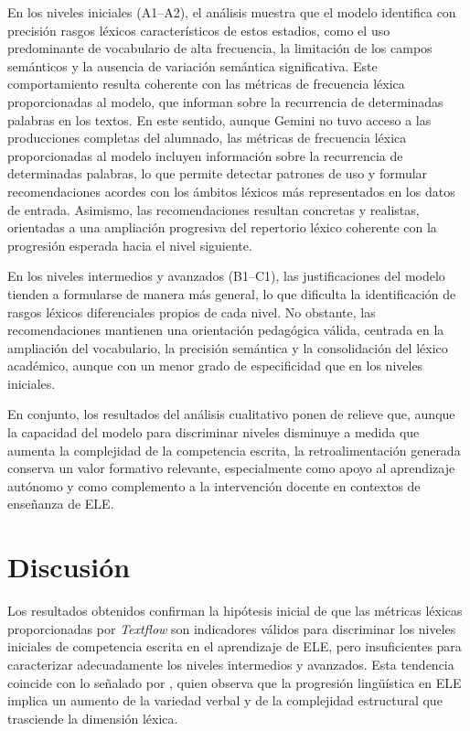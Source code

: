 \documentclass[spanish]{textolivre}
\begin{document}
En los niveles iniciales (A1–A2), el análisis muestra que el modelo identifica con precisión rasgos léxicos característicos de estos estadios, como el uso predominante de vocabulario de alta frecuencia, la limitación de los campos semánticos y la ausencia de variación semántica significativa. Este comportamiento resulta coherente con las métricas de frecuencia léxica proporcionadas al modelo, que informan sobre la recurrencia de determinadas palabras en los textos. En este sentido, aunque Gemini no tuvo acceso a las producciones completas del alumnado, las métricas de frecuencia léxica proporcionadas al modelo incluyen información sobre la recurrencia de determinadas palabras, lo que permite detectar patrones de uso y formular recomendaciones acordes con los ámbitos léxicos más representados en los datos de entrada. Asimismo, las recomendaciones resultan concretas y realistas, orientadas a una ampliación progresiva del repertorio léxico coherente con la progresión esperada hacia el nivel siguiente.

En los niveles intermedios y avanzados (B1–C1), las justificaciones del modelo tienden a formularse de manera más general, lo que dificulta la identificación de rasgos léxicos diferenciales propios de cada nivel. No obstante, las recomendaciones mantienen una orientación pedagógica válida, centrada en la ampliación del vocabulario, la precisión semántica y la consolidación del léxico académico, aunque con un menor grado de especificidad que en los niveles iniciales.

En conjunto, los resultados del análisis cualitativo ponen de relieve que, aunque la capacidad del modelo para discriminar niveles disminuye a medida que aumenta la complejidad de la competencia escrita, la retroalimentación generada conserva un valor formativo relevante, especialmente como apoyo al aprendizaje autónomo y como complemento a la intervención docente en contextos de enseñanza de ELE.


\section{Discusión}

Los resultados obtenidos confirman la hipótesis inicial de que las métricas léxicas proporcionadas por \textit{Textflow} son indicadores válidos para discriminar los niveles iniciales de competencia escrita en el aprendizaje de ELE, pero insuficientes para caracterizar adecuadamente los niveles intermedios y avanzados. Esta tendencia coincide con lo señalado por \textcite{torre_garcia2016}, quien observa que la progresión lingüística en ELE implica un aumento de la variedad verbal y de la complejidad estructural que trasciende la dimensión léxica.
\end{document}
